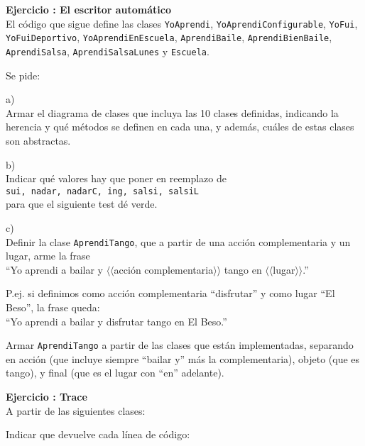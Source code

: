 \documentclass[a4paper,12pt]{article}
\newcounter{ej}
\newcounter{prte}
\newcommand{\ejercicio}[1]{\stepcounter{ej} \setcounter{prte}{0} \par \textbf{ Ejercicio \arabic{ej}: #1} \\ }
\begin{document}
\bigskip

\ejercicio{El escritor automático}
El código que sigue define las clases 
\texttt{YoAprendi}, \texttt{YoAprendiConfigurable}, 
\texttt{YoFui}, \\ \texttt{YoFuiDeportivo},
\texttt{YoAprendiEnEscuela}, \texttt{AprendiBaile},
\texttt{AprendiBienBaile}, \\ \texttt{AprendiSalsa}, \texttt{AprendiSalsaLunes} 
y \texttt{Escuela}.

\medskip\noindent


Se pide: 

a) \\
Armar el diagrama de clases que incluya las 10 clases definidas, indicando la herencia y qué métodos se definen en cada una, y además, cuáles de estas clases son abstractas.

\medskip\noindent
b) \\
Indicar qué valores hay que poner en reemplazo de \\
\texttt{sui, nadar, nadarC, ing, salsi, salsiL} \\
para que el siguiente test dé verde.

\noindent


\medskip\noindent
c) \\
Definir la clase \texttt{AprendiTango}, que a partir de una acción complementaria y un lugar, arme la frase \\
``Yo aprendi a bailar y $\langle\langle$acción complementaria$\rangle\rangle$ tango en $\langle\langle$lugar$\rangle\rangle$.''

P.ej. si definimos como acción complementaria ``disfrutar'' y como lugar ``El Beso'', la frase queda: \\
``Yo aprendi a bailar y disfrutar tango en El Beso.''

Armar \texttt{AprendiTango} a partir de las clases que están implementadas, separando en acción (que incluye siempre ``bailar y'' más la complementaria), objeto (que es tango), y final (que es el lugar con ``en'' adelante).

\newpage
\ejercicio{Trace}
A partir de las siguientes clases:


\medskip\noindent
Indicar que devuelve cada línea de código:

\newpage
\end{document}
